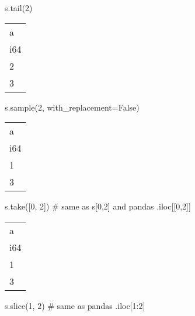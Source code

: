 \documentclass[
  letterpaper,
  DIV=11,
  numbers=noendperiod]{scrartcl}
\newenvironment{Shaded}{\begin{snugshade}}{\end{snugshade}}
\newcommand{\BuiltInTok}[1]{\textcolor[rgb]{0.00,0.23,0.31}{#1}}
\newcommand{\CommentTok}[1]{\textcolor[rgb]{0.37,0.37,0.37}{#1}}
\newcommand{\DecValTok}[1]{\textcolor[rgb]{0.68,0.00,0.00}{#1}}
\newcommand{\NormalTok}[1]{\textcolor[rgb]{0.00,0.23,0.31}{#1}}
\newcommand{\OperatorTok}[1]{\textcolor[rgb]{0.37,0.37,0.37}{#1}}
\newcommand{\VariableTok}[1]{\textcolor[rgb]{0.07,0.07,0.07}{#1}}
\begin{document}
\begin{Shaded}
\begin{Highlighting}[]
\NormalTok{s.tail(}\DecValTok{2}\NormalTok{)}
\end{Highlighting}
\end{Shaded}

\begin{longtable}[]{@{}l@{}}
\toprule()
a \\
i64 \\
\midrule()
\endhead
2 \\
3 \\
\bottomrule()
\end{longtable}

\begin{Shaded}
\begin{Highlighting}[]
\NormalTok{s.sample(}\DecValTok{2}\NormalTok{, with\_replacement}\OperatorTok{=}\VariableTok{False}\NormalTok{)}
\end{Highlighting}
\end{Shaded}

\begin{longtable}[]{@{}l@{}}
\toprule()
a \\
i64 \\
\midrule()
\endhead
1 \\
3 \\
\bottomrule()
\end{longtable}

\begin{Shaded}
\begin{Highlighting}[]
\NormalTok{s.take([}\DecValTok{0}\NormalTok{, }\DecValTok{2}\NormalTok{]) }\CommentTok{\# same as s[0,2] and pandas .iloc[[0,2]]}
\end{Highlighting}
\end{Shaded}

\begin{longtable}[]{@{}l@{}}
\toprule()
a \\
i64 \\
\midrule()
\endhead
1 \\
3 \\
\bottomrule()
\end{longtable}

\begin{Shaded}
\begin{Highlighting}[]
\NormalTok{s.}\BuiltInTok{slice}\NormalTok{(}\DecValTok{1}\NormalTok{, }\DecValTok{2}\NormalTok{) }\CommentTok{\# same as pandas .iloc[1:2]}
\end{Highlighting}
\end{Shaded}
\end{document}
